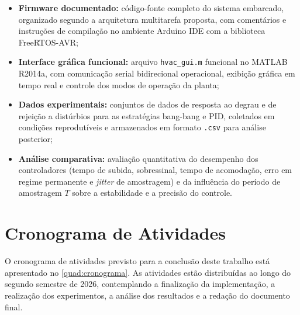 \documentclass[repeatfields,xlists,xpacks,oneside]{ufrgscca}
\begin{document}
\begin{itemize}
    \item \textbf{Firmware documentado:} código-fonte
    completo do sistema embarcado, organizado segundo a
    arquitetura multitarefa proposta, com comentários e
    instruções de compilação no ambiente Arduino IDE com a
    biblioteca FreeRTOS-AVR;

    \item \textbf{Interface gráfica funcional:} arquivo
    \texttt{hvac\_gui.m} funcional no MATLAB R2014a, com
    comunicação serial bidirecional operacional, exibição
    gráfica em tempo real e controle dos modos de operação
    da planta;

    \item \textbf{Dados experimentais:} conjuntos de dados
    de resposta ao degrau e de rejeição a distúrbios para
    as estratégias bang-bang e PID, coletados em condições
    reprodutíveis e armazenados em formato \texttt{.csv}
    para análise posterior;

    \item \textbf{Análise comparativa:} avaliação
    quantitativa do desempenho dos controladores (tempo de
    subida, sobressinal, tempo de acomodação, erro em regime
    permanente e \textit{jitter} de amostragem) e da
    influência do período de amostragem $T$ sobre a
    estabilidade e a precisão do controle.
\end{itemize}


\chapter{Cronograma de Atividades}

O cronograma de atividades previsto para a conclusão deste trabalho está apresentado no \autoref{quad:cronograma}. As atividades estão distribuídas ao longo do segundo semestre de 2026, contemplando a finalização da implementação, a realização dos experimentos, a análise dos resultados e a redação do documento final.
\end{document}
